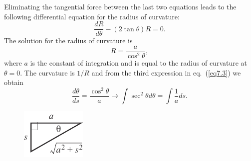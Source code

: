 \documentclass{AeroStructure-ERJohnson}
\begin{document}
\begin{example}
\noindent Eliminating the tangential force between the last two equations leads to the following differential equation for the radius of curvature:
\begin{equation}
\frac{d R}{d \theta}-(2 \tan \theta) R=0. \label{eq7.5.c}\tag{c}
\end{equation}
The solution for the radius of curvature is
\begin{equation}
R=\frac{a}{\cos ^{2} \theta}, \label{eq7.5.d}\tag{d}
\end{equation}
where $a$ is the constant of integration and is equal to the radius of curvature at $\theta= 0$. The curvature is $1/R$ and from the third expression in eq.~(\ref{eq7.3}) we obtain
\begin{equation}
\frac{d \theta}{d s}=\frac{\cos ^{2} \theta}{a} \rightarrow \int \sec ^{2} \theta d \theta=\int \frac{1}{a} d s. \label{eq7.5.e}\tag{e}
\end{equation}

\begin{figure}
\includegraphics{Figure_7-15.pdf}
\caption{\label{fig7.15}}
\end{figure}

\vspace*{-0.5pc}


\end{example}
\end{document}
